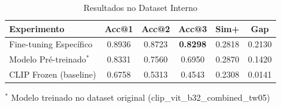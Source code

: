 
\begin{table}[htbp]
\centering
\caption{Resultados no Dataset Interno}
\label{tab:internal_results}
\begin{tabular}{lccccc}
\toprule
\textbf{Experimento} & \textbf{Acc@1} & \textbf{Acc@2} & \textbf{Acc@3} & \textbf{Sim+} & \textbf{Gap} \\
\midrule
Fine-tuning Específico & 0.8936 & 0.8723 & \textbf{0.8298} & 0.2818 & 0.2130 \\
Modelo Pré-treinado$^*$ & 0.8331 & 0.7560 & 0.6950 & 0.2870 & 0.1420 \\
CLIP Frozen (baseline) & 0.6758 & 0.5313 & 0.4543 & 0.2308 & 0.0141 \\
\bottomrule
\end{tabular}
\begin{tablenotes}
\small
\item $^*$ Modelo treinado no dataset original (clip\_vit\_b32\_combined\_tw05)
\end{tablenotes}
\end{table}
